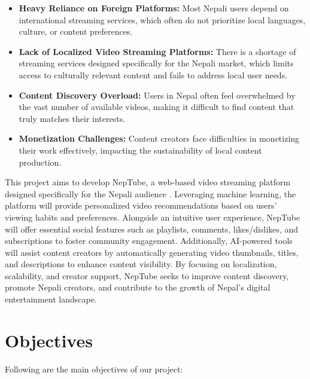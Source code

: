 \begin{itemize}[leftmargin=2cm]
  \item \textbf{Heavy Reliance on Foreign Platforms:} Most Nepali users depend on international streaming services, which often do not prioritize local languages, culture, or content preferences.

  \item \textbf{Lack of Localized Video Streaming Platforms:} There is a shortage of streaming services designed specifically for the Nepali market, which limits access to culturally relevant content and fails to address local user needs.

  \item \textbf{Content Discovery Overload:} Users in Nepal often feel overwhelmed by the vast number of available videos, making it difficult to find content that truly matches their interests.

  \item \textbf{Monetization Challenges:} Content creators face difficulties in monetizing their work effectively, impacting the sustainability of local content production.
\end{itemize}

This project aims to develop NepTube, a web-based video streaming platform designed specifically for the Nepali audience \cite{daamideal2025ott}. Leveraging machine learning, the platform will provide personalized video recommendations based on users' viewing habits and preferences. Alongside an intuitive user experience, NepTube will offer essential social features such as playlists, comments, likes/dislikes, and subscriptions to foster community engagement. Additionally, AI-powered tools \cite{openai2023gpt4} will assist content creators by automatically generating video thumbnails, titles, and descriptions to enhance content visibility. By focusing on localization, scalability, and creator support, NepTube seeks to improve content discovery, promote Nepali creators, and contribute to the growth of Nepal's digital entertainment landscape.

\section{Objectives}

Following are the main objectives of our project:

